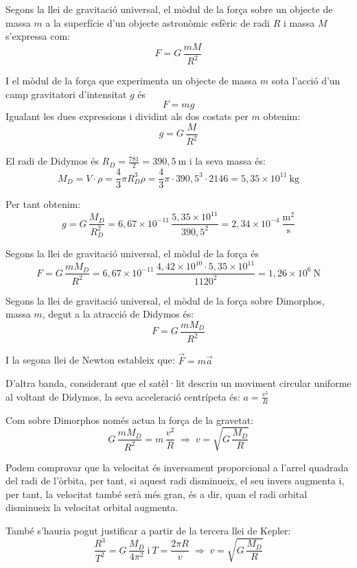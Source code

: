 \begin{solapartat}
 Segons la llei de gravitació universal, el mòdul de la força sobre un objecte de massa $m$ a la superfície d'un objecte astronòmic esfèric de radi $R$ i massa $M$ s'expressa com:
\[ F = G\,\frac{mM}{R^2} \]

 I el mòdul de la força que experimenta un objecte de massa $m$ sota l'acció d'un camp gravitatori d'intensitat $g$ és
\[ F = mg \]
Igualant les dues expressions i dividint als dos costats per $m$ obtenim:
\[ g = G\,\frac{M}{R^2} \]

 El radi de Didymos és $R_D = \frac{781}{2} = 390,5\ \mathrm{m}$ i la seva massa és:
\[ M_D = V\cdot\rho = \frac{4}{3}\pi R_D^3\rho = \frac{4}{3}\pi\cdot 390,5^3\cdot 2146 = 5,35\times 10^{11}\ \mathrm{kg} \]

 Per tant obtenim:
\[ g = G\,\frac{M_D}{R_D^2} = 6,67\times 10^{-11}\,\frac{5,35\times 10^{11}}{390,5^2} = 2,34\times 10^{-4}\ \frac{\mathrm{m^2}}{\mathrm{s}} \]

 Segons la llei de gravitació universal, el mòdul de la força és
\[ F = G\,\frac{mM_D}{R^2} = 6,67\times 10^{-11}\,\frac{4,42\times 10^{10}\cdot 5,35\times 10^{11}}{1120^2} = 1,26\times 10^{6}\ \mathrm{N} \]
\end{solapartat}

\begin{solapartat}
 Segons la llei de gravitació universal, el mòdul de la força sobre Dimorphos, massa $m$, degut a la atracció de Didymos és:
\[ F = G\,\frac{mM_D}{R^2} \]

 I la segona llei de Newton estableix que: $\vec{F} = m\vec{a}$

 D'altra banda, considerant que el satèl·lit descriu un moviment circular uniforme al voltant de Didymos, la seva acceleració centrípeta és: $a = \frac{v^2}{R}$

 Com sobre Dimorphos només actua la força de la gravetat:
\[ G\,\frac{mM_D}{R^2} = m\,\frac{v^2}{R} \;\Rightarrow\; v = \sqrt{G\,\frac{M_D}{R}} \]

 Podem comprovar que la velocitat és inversament proporcional a l'arrel quadrada del radi de l'òrbita, per tant, si aquest radi disminueix, el seu invers augmenta i, per tant, la velocitat també serà més gran, és a dir, quan el radi orbital disminueix la velocitat orbital augmenta.

També s'hauria pogut justificar a partir de la tercera llei de Kepler:
\[ \frac{R^3}{T^2} = G\,\frac{M_D}{4\pi^2} \ \text{i}\ T = \frac{2\pi R}{v} \;\Rightarrow\; v = \sqrt{G\,\frac{M_D}{R}} \]
\end{solapartat}
